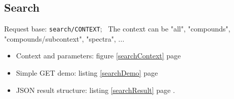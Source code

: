 \subsection{Search}
\hspace*{\parindent}
Request base: \texttt{search/CONTEXT};~
The context can be "all", "compounds", "compounds/subcontext", "spectra", ...
\begin{itemize}
	\item Context and parameters: \cf figure \ref{searchContext} page \pageref{searchContext}
	\item Simple GET demo: \cf listing \ref{searchDemo} page \pageref{searchDemo}
	\item JSON result structure: \cf listing \ref{searchResult} page \pageref{searchResult}. 
\end{itemize}
